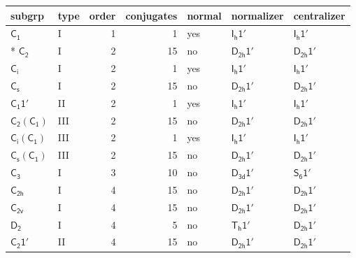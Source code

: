 \documentclass[10pt,a4paper]{article}
\numberwithin{equation}{section}
\newcommand{\grp}[1]{\mathsf{#1}}
\begin{document}
{\small\begin{longtable}{@{}llrrlll@{}}\toprule
subgrp & type & order & conjugates & normal & normalizer & centralizer\\\midrule\endhead
\bottomrule\endfoot\endlastfoot
\href{../../../rotation/data/pdf/C1.pdf}{$\grp{C_{1}}$} & I & 1 & 1 & yes & \href{Ih-1p.pdf}{$\grp{I_{h}1'}$} & \href{Ih-1p.pdf}{$\grp{I_{h}1'}$}\\*
\href{../../../rotation/data/pdf/C2.pdf}{$\grp{C_{2}}$} & I & 2 & 15 & no & \href{D2h-1p.pdf}{$\grp{D_{2h}1'}$} & \href{D2h-1p.pdf}{$\grp{D_{2h}1'}$}\\
\href{../../../rotation/data/pdf/S2.pdf}{$\grp{C_{i}}$} & I & 2 & 1 & yes & \href{Ih-1p.pdf}{$\grp{I_{h}1'}$} & \href{Ih-1p.pdf}{$\grp{I_{h}1'}$}\\
\href{../../../rotation/data/pdf/C1v.pdf}{$\grp{C_{s}}$} & I & 2 & 15 & no & \href{D2h-1p.pdf}{$\grp{D_{2h}1'}$} & \href{D2h-1p.pdf}{$\grp{D_{2h}1'}$}\\
\href{C1-1p.pdf}{$\grp{C_{1}1'}$} & II & 2 & 1 & yes & \href{Ih-1p.pdf}{$\grp{I_{h}1'}$} & \href{Ih-1p.pdf}{$\grp{I_{h}1'}$}\\
\href{C2-C1.pdf}{$\grp{C_{2}}(\grp{C_{1}})$} & III & 2 & 15 & no & \href{D2h-1p.pdf}{$\grp{D_{2h}1'}$} & \href{D2h-1p.pdf}{$\grp{D_{2h}1'}$}\\
\href{S2-C1.pdf}{$\grp{C_{i}}(\grp{C_{1}})$} & III & 2 & 1 & yes & \href{Ih-1p.pdf}{$\grp{I_{h}1'}$} & \href{Ih-1p.pdf}{$\grp{I_{h}1'}$}\\
\href{C1v-C1.pdf}{$\grp{C_{s}}(\grp{C_{1}})$} & III & 2 & 15 & no & \href{D2h-1p.pdf}{$\grp{D_{2h}1'}$} & \href{D2h-1p.pdf}{$\grp{D_{2h}1'}$}\\
\href{../../../rotation/data/pdf/C3.pdf}{$\grp{C_{3}}$} & I & 3 & 10 & no & \href{D3d-1p.pdf}{$\grp{D_{3d}1'}$} & \href{S6-1p.pdf}{$\grp{S_{6}1'}$}\\
\href{../../../rotation/data/pdf/C2h.pdf}{$\grp{C_{2h}}$} & I & 4 & 15 & no & \href{D2h-1p.pdf}{$\grp{D_{2h}1'}$} & \href{D2h-1p.pdf}{$\grp{D_{2h}1'}$}\\
\href{../../../rotation/data/pdf/C2v.pdf}{$\grp{C_{2v}}$} & I & 4 & 15 & no & \href{D2h-1p.pdf}{$\grp{D_{2h}1'}$} & \href{D2h-1p.pdf}{$\grp{D_{2h}1'}$}\\
\href{../../../rotation/data/pdf/D2.pdf}{$\grp{D_{2}}$} & I & 4 & 5 & no & \href{Th-1p.pdf}{$\grp{T_{h}1'}$} & \href{D2h-1p.pdf}{$\grp{D_{2h}1'}$}\\
\href{C2-1p.pdf}{$\grp{C_{2}1'}$} & II & 4 & 15 & no & \href{D2h-1p.pdf}{$\grp{D_{2h}1'}$} & \href{D2h-1p.pdf}{$\grp{D_{2h}1'}$}\\

\end{longtable}}
\end{document}
